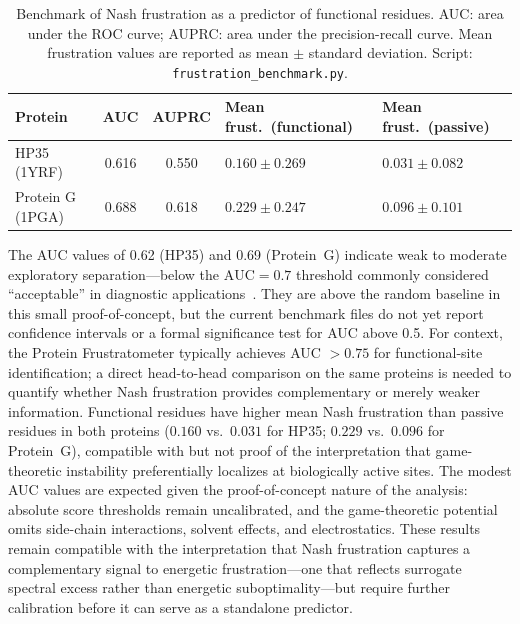 \documentclass[12pt,a4paper]{article}
\theoremstyle{remark}
\begin{document}
\begin{table}[htbp]
\centering
\caption{Benchmark of Nash frustration as a predictor of functional residues. AUC: area under the ROC curve; AUPRC: area under the precision-recall curve. Mean frustration values are reported as mean $\pm$ standard deviation. Script: \texttt{frustration\_benchmark.py}.}
\label{tab:frustration-benchmark}
\begin{tabularx}{\textwidth}{@{}L{0.18\textwidth} c c Y Y@{}}
\toprule
\textbf{Protein} & \textbf{AUC} & \textbf{AUPRC} & \textbf{Mean frust.\ (functional)} & \textbf{Mean frust.\ (passive)} \\
\midrule
HP35 (1YRF) & 0.616 & 0.550 & $0.160 \pm 0.269$ & $0.031 \pm 0.082$ \\
Protein G (1PGA) & 0.688 & 0.618 & $0.229 \pm 0.247$ & $0.096 \pm 0.101$ \\
\bottomrule
\end{tabularx}
\end{table}

The AUC values of 0.62 (HP35) and 0.69 (Protein~G) indicate weak to moderate exploratory separation---below the $\text{AUC} = 0.7$ threshold commonly considered ``acceptable'' in diagnostic applications~\citep{Ferreiro2014}. They are above the random baseline in this small proof-of-concept, but the current benchmark files do not yet report confidence intervals or a formal significance test for AUC above 0.5. For context, the Protein Frustratometer typically achieves AUC $> 0.75$ for functional-site identification; a direct head-to-head comparison on the same proteins is needed to quantify whether Nash frustration provides complementary or merely weaker information. Functional residues have higher mean Nash frustration than passive residues in both proteins ($0.160$ vs.\ $0.031$ for HP35; $0.229$ vs.\ $0.096$ for Protein~G), compatible with but not proof of the interpretation that game-theoretic instability preferentially localizes at biologically active sites. The modest AUC values are expected given the proof-of-concept nature of the analysis: absolute score thresholds remain uncalibrated, and the game-theoretic potential omits side-chain interactions, solvent effects, and electrostatics. These results remain compatible with the interpretation that Nash frustration captures a complementary signal to energetic frustration---one that reflects surrogate spectral excess rather than energetic suboptimality---but require further calibration before it can serve as a standalone predictor.
\end{document}
